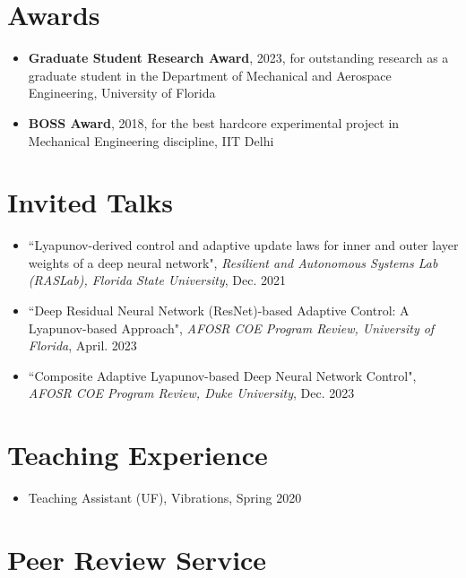 \documentclass[10pt, letterpaper]{article}
\begin{document}
\section{Awards}

\begin{itemize}
    \item \textbf{Graduate Student Research Award}, 2023, for outstanding research as a graduate student in the Department of Mechanical and Aerospace Engineering, University of Florida
    \item \textbf{BOSS Award}, 2018, for the best hardcore experimental project in Mechanical Engineering discipline, IIT Delhi
\end{itemize}

\section{Invited Talks}

\begin{itemize}

\item{``Lyapunov-derived control and adaptive update laws for inner and outer layer weights of a deep neural network", \textit{Resilient and Autonomous Systems Lab (RASLab), Florida State University}, Dec. 2021}

\item{``Deep Residual Neural Network (ResNet)-based Adaptive Control: A Lyapunov-based Approach", \textit{AFOSR COE Program Review, University of Florida}, April. 2023}

\item{``Composite Adaptive Lyapunov-based Deep Neural Network Control", \textit{AFOSR COE Program Review, Duke University}, Dec. 2023}

\end{itemize}

\section{Teaching Experience}

\begin{itemize}
\item{Teaching Assistant (UF), Vibrations, Spring 2020}
\end{itemize}




\section{Peer Review Service}
\end{document}
